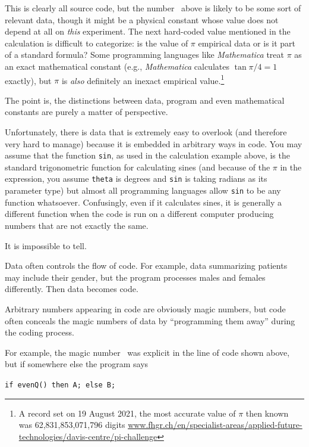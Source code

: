 \documentclass[10pt,a4paper]{article}
\begin{document}
This is clearly all source code, but the number \the\magicNumber\ above is likely to be some sort of relevant data, though it might be a physical constant whose value does not depend at all on \emph{this\/} experiment. The next hard-coded value mentioned in the calculation is difficult to categorize: is the value of $\pi$ empirical data or is it part of a standard formula? Some programming languages like \emph{Mathematica\/} treat $\pi$ as an exact mathematical constant (e.g., \emph{Mathematica\/} calculates $\tan\pi/4 = 1$ exactly), but $\pi$ is \emph{also\/} definitely an inexact empirical value.\footnote{A record set on 19 August 2021, the most accurate value of $\pi$ then known was 62,831,853,071,796 digits %
\url{www.fhgr.ch/en/specialist-areas/applied-future-technologies/davis-centre/pi-challenge}} 

The point is, the distinctions between data, program and even mathematical constants are purely a matter of perspective.

Unfortunately, there is data that is extremely easy to overlook (and therefore very hard to manage) because it is embedded in arbitrary ways in code. You may assume that the function \texttt{sin}, as used in the calculation example above, is the standard trigonometric function for calculating sines (and because of the $\pi$ in the expression, you assume \texttt{theta} is degrees and \texttt{sin} is taking radians as its parameter type) but almost all programming languages allow \texttt{sin} to be any function whatsoever. Confusingly, even if it calculates sines, it is generally a different function when the code is run on a different computer producing numbers that are not exactly the same.

It is impossible to tell. 

Data often controls the flow of code. For example, data summarizing patients may include their gender, but the program processes males and females differently. Then data becomes code.

Arbitrary numbers appearing in code are obviously magic numbers, but code often conceals the magic numbers of data by ``programming them away'' during the coding process. 

For example, the magic number \the\magicNumber\ was explicit in the line of code shown above, but if somewhere else the program says

\begin{center}\texttt{if evenQ(\the\magicNumber) then A; else B;}\end{center}
\end{document}
